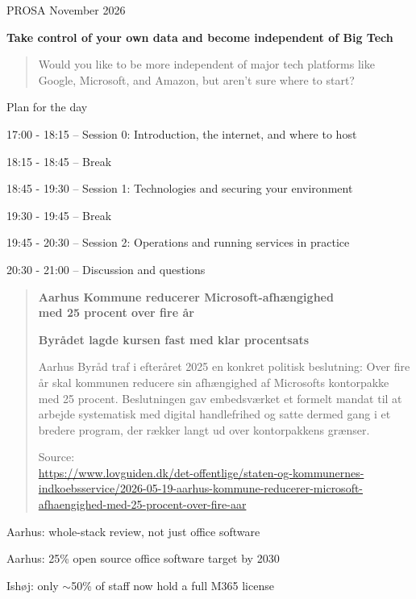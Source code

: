 \documentclass[Screen16to9,17pt]{foils}
\begin{document}
{PROSA November 2026}


\hlkprofiluk




{\bf \large Take control of your own data and become independent of Big Tech}


\begin{quote}\large
Would you like to be more independent of major tech platforms like Google, Microsoft, and Amazon, but aren't sure where to start?
\end{quote}




Plan for the day
\begin{list1}
\item 17:00 - 18:15 -- Session 0: Introduction, the internet, and where to host
\item 18:15 - 18:45 -- Break
\item 18:45 - 19:30 -- Session 1: Technologies and securing your environment
\item 19:30 - 19:45 -- Break
\item 19:45 - 20:30 -- Session 2: Operations and running services in practice
\item 20:30 - 21:00 -- Discussion and questions
\end{list1}


\begin{quote}{\large \bf
Aarhus Kommune reducerer Microsoft-afhængighed\\
med 25 procent over fire år}

{\bf Byrådet lagde kursen fast med klar procentsats}

Aarhus Byråd traf i efteråret 2025 en konkret politisk beslutning: Over fire år skal kommunen reducere sin afhængighed af Microsofts kontorpakke med 25 procent. Beslutningen gav embedsværket et formelt mandat til at arbejde systematisk med digital handlefrihed og satte dermed gang i et bredere program, der rækker langt ud over kontorpakkens grænser.


Source:\\{\scriptsize\url{https://www.lovguiden.dk/det-offentlige/staten-og-kommunernes-indkoebsservice/2026-05-19-aarhus-kommune-reducerer-microsoft-afhaengighed-med-25-procent-over-fire-aar}}
\end{quote}
\begin{list2}
\item Aarhus: whole-stack review, not just office software
\item Aarhus: 25\% open source office software target by 2030
\item Ish{\o}j: only $\sim$50\% of staff now hold a full M365 license
\end{list2}
\end{document}
